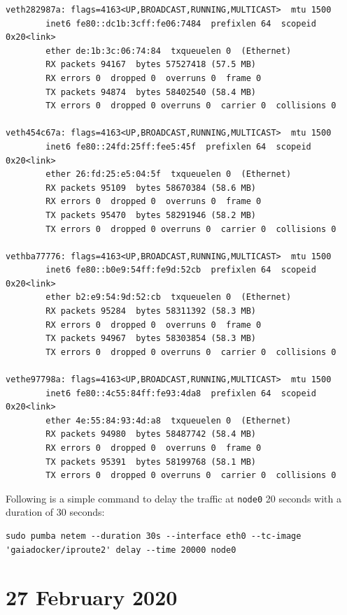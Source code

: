 \documentclass{article}
\begin{document}
\begin{lstlisting}[basicstyle=\small]
veth282987a: flags=4163<UP,BROADCAST,RUNNING,MULTICAST>  mtu 1500
        inet6 fe80::dc1b:3cff:fe06:7484  prefixlen 64  scopeid 0x20<link>
        ether de:1b:3c:06:74:84  txqueuelen 0  (Ethernet)
        RX packets 94167  bytes 57527418 (57.5 MB)
        RX errors 0  dropped 0  overruns 0  frame 0
        TX packets 94874  bytes 58402540 (58.4 MB)
        TX errors 0  dropped 0 overruns 0  carrier 0  collisions 0

veth454c67a: flags=4163<UP,BROADCAST,RUNNING,MULTICAST>  mtu 1500
        inet6 fe80::24fd:25ff:fee5:45f  prefixlen 64  scopeid 0x20<link>
        ether 26:fd:25:e5:04:5f  txqueuelen 0  (Ethernet)
        RX packets 95109  bytes 58670384 (58.6 MB)
        RX errors 0  dropped 0  overruns 0  frame 0
        TX packets 95470  bytes 58291946 (58.2 MB)
        TX errors 0  dropped 0 overruns 0  carrier 0  collisions 0

vethba77776: flags=4163<UP,BROADCAST,RUNNING,MULTICAST>  mtu 1500
        inet6 fe80::b0e9:54ff:fe9d:52cb  prefixlen 64  scopeid 0x20<link>
        ether b2:e9:54:9d:52:cb  txqueuelen 0  (Ethernet)
        RX packets 95284  bytes 58311392 (58.3 MB)
        RX errors 0  dropped 0  overruns 0  frame 0
        TX packets 94967  bytes 58303854 (58.3 MB)
        TX errors 0  dropped 0 overruns 0  carrier 0  collisions 0

vethe97798a: flags=4163<UP,BROADCAST,RUNNING,MULTICAST>  mtu 1500
        inet6 fe80::4c55:84ff:fe93:4da8  prefixlen 64  scopeid 0x20<link>
        ether 4e:55:84:93:4d:a8  txqueuelen 0  (Ethernet)
        RX packets 94980  bytes 58487742 (58.4 MB)
        RX errors 0  dropped 0  overruns 0  frame 0
        TX packets 95391  bytes 58199768 (58.1 MB)
        TX errors 0  dropped 0 overruns 0  carrier 0  collisions 0

\end{lstlisting}

Following is a simple command to delay the traffic at \texttt{node0} 20 seconds with a duration of 30 seconds:

\begin{lstlisting}
sudo pumba netem --duration 30s --interface eth0 --tc-image 'gaiadocker/iproute2' delay --time 20000 node0
\end{lstlisting}

\section*{27 February 2020}
\end{document}
